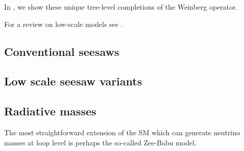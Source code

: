 In , we show these unique tree-level completions of the Weinberg operator.

For a review on low-scale models see \cite{Boucenna:2014zba}.

\subsection{Conventional seesaws}

\subsection{Low scale seesaw variants}

\subsection{Radiative masses}

The most straightforward extension of the SM which can generate neutrino masses at loop level is perhaps the so-called Zee-Babu model.